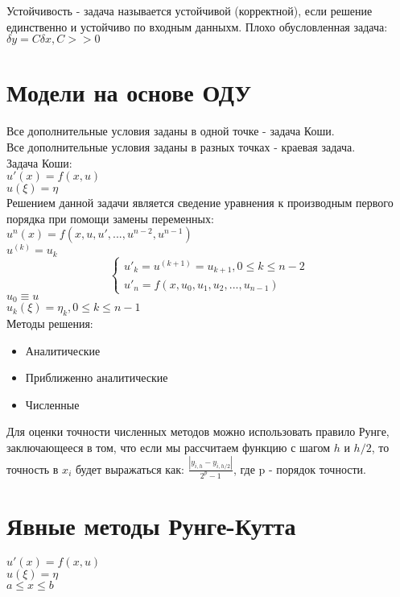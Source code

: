 Устойчивость - задача называется устойчивой (корректной), если решение единственно и устойчиво по входным данныхм. Плохо обусловленная задача: $\delta y = C \delta x, C >> 0$

\section{Модели на основе ОДУ}
Все дополнительные условия заданы в одной точке - задача Коши.\\
Все дополнительные условия заданы в разных точках - краевая задача.\\

Задача Коши:\\
$u'(x) = f(x, u)$\\
$u(\xi) = \eta$\\

Решением данной задачи является сведение уравнения к производным первого порядка при помощи замены переменных:\\
$u^{n}(x) = f(x, u, u', ..., u^{n-2}, u^{n-1})$\\
$u^{(k)} = u_{k}$\\

\begin{equation}
\begin{cases}
u'_{k}=u^{(k+1)}=u_{k+1}, 0 \leqslant k \leqslant n - 2\\
u'_{n} = f(x, u_{0}, u_{1}, u_{2}, ..., u_{n-1})
\end{cases}
\end{equation}
$u_{0} \equiv u$\\
$u_{k}(\xi) = \eta_{k}, 0 \leqslant k \leqslant n - 1$\\

Методы решения:\\
\begin{itemize}
\item Аналитические
\item Приближенно аналитические
\item Численные
\end{itemize}

Для оценки точности численных методов можно использовать правило Рунге, заключающееся в том, что если мы рассчитаем функцию с шагом $h$ и $h/2$, то точность в $x_{i}$ будет выражаться как: $\frac{|y_{i, h} - y_{i, h/2}|}{2^{p} - 1}$, где p - порядок точности.

\section{Явные методы Рунге-Кутта}
$u'(x) = f(x, u)$\\
$u(\xi) = \eta$\\
$a \leqslant x \leqslant b$\\

